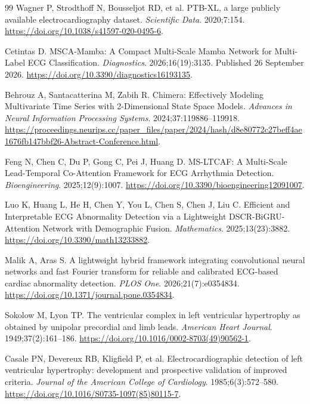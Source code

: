 \documentclass[11pt,a4paper]{article}
\begin{document}
\begingroup
\setlength{\bibsep}{3pt}
\begin{thebibliography}{99}
 Wagner P, Strodthoff N, Bousseljot RD, et al. PTB-XL, a large publicly available electrocardiography dataset. \emph{Scientific Data}. 2020;7:154. \url{https://doi.org/10.1038/s41597-020-0495-6}.

 Cetintas D. MSCA-Mamba: A Compact Multi-Scale Mamba Network for Multi-Label ECG Classification. \emph{Diagnostics}. 2026;16(19):3135. Published 26 September 2026. \url{https://doi.org/10.3390/diagnostics16193135}.

 Behrouz A, Santacatterina M, Zabih R. Chimera: Effectively Modeling Multivariate Time Series with 2-Dimensional State Space Models. \emph{Advances in Neural Information Processing Systems}. 2024;37:119886--119918. \url{https://proceedings.neurips.cc/paper_files/paper/2024/hash/d8e80772c27beff4ae1676fb147bbf26-Abstract-Conference.html}.

 Feng N, Chen C, Du P, Gong C, Pei J, Huang D. MS-LTCAF: A Multi-Scale Lead-Temporal Co-Attention Framework for ECG Arrhythmia Detection. \emph{Bioengineering}. 2025;12(9):1007. \url{https://doi.org/10.3390/bioengineering12091007}.

 Luo K, Huang L, He H, Chen Y, You L, Chen S, Chen J, Liu C. Efficient and Interpretable ECG Abnormality Detection via a Lightweight DSCR-BiGRU-Attention Network with Demographic Fusion. \emph{Mathematics}. 2025;13(23):3882. \url{https://doi.org/10.3390/math13233882}.

 Malik A, Aras S. A lightweight hybrid framework integrating convolutional neural networks and fast Fourier transform for reliable and calibrated ECG-based cardiac abnormality detection. \emph{PLOS One}. 2026;21(7):e0354834. \url{https://doi.org/10.1371/journal.pone.0354834}.

 Sokolow M, Lyon TP. The ventricular complex in left ventricular hypertrophy as obtained by unipolar precordial and limb leads. \emph{American Heart Journal}. 1949;37(2):161--186. \url{https://doi.org/10.1016/0002-8703(49)90562-1}.

 Casale PN, Devereux RB, Kligfield P, et al. Electrocardiographic detection of left ventricular hypertrophy: development and prospective validation of improved criteria. \emph{Journal of the American College of Cardiology}. 1985;6(3):572--580. \url{https://doi.org/10.1016/S0735-1097(85)80115-7}.


\end{thebibliography}
\end{document}
